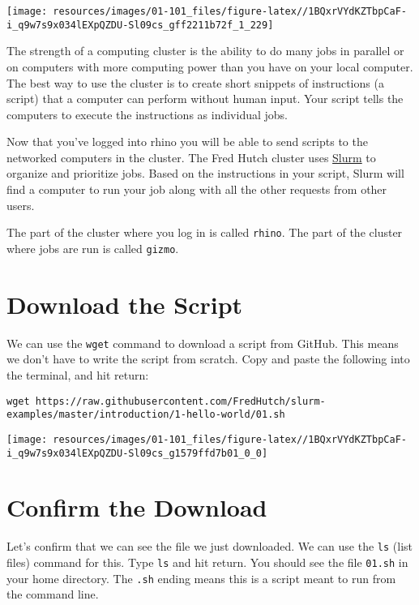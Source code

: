\documentclass[
]{book}
\begin{document}
\texttt{[image: resources/images/01-101\_files/figure-latex//1BQxrVYdKZTbpCaF-i\_q9w7s9x034lEXpQZDU-Sl09cs\_gff2211b72f\_1\_229]}

The strength of a computing cluster is the ability to do many jobs in parallel or on computers with more computing power than you have on your local computer. The best way to use the cluster is to create short snippets of instructions (a script) that a computer can perform without human input. Your script tells the computers to execute the instructions as individual jobs.

Now that you've logged into rhino you will be able to send scripts to the networked computers in the cluster. The Fred Hutch cluster uses \href{https://slurm.schedmd.com/overview.html}{Slurm} to organize and prioritize jobs. Based on the instructions in your script, Slurm will find a computer to run your job along with all the other requests from other users.

The part of the cluster where you log in is called \texttt{rhino}. The part of the cluster where jobs are run is called \texttt{gizmo}.

\hypertarget{download-the-script}{%
\section{Download the Script}\label{download-the-script}}

We can use the \texttt{wget} command to download a script from GitHub. This means we don't have to write the script from scratch. Copy and paste the following into the terminal, and hit return:

\begin{verbatim}
wget https://raw.githubusercontent.com/FredHutch/slurm-examples/master/introduction/1-hello-world/01.sh
\end{verbatim}

\texttt{[image: resources/images/01-101\_files/figure-latex//1BQxrVYdKZTbpCaF-i\_q9w7s9x034lEXpQZDU-Sl09cs\_g1579ffd7b01\_0\_0]}

\hypertarget{confirm-the-download}{%
\section{Confirm the Download}\label{confirm-the-download}}

Let's confirm that we can see the file we just downloaded. We can use the \texttt{ls} (list files) command for this. Type \texttt{ls} and hit return. You should see the file \texttt{01.sh} in your home directory. The \texttt{.sh} ending means this is a script meant to run from the command line.
\end{document}
